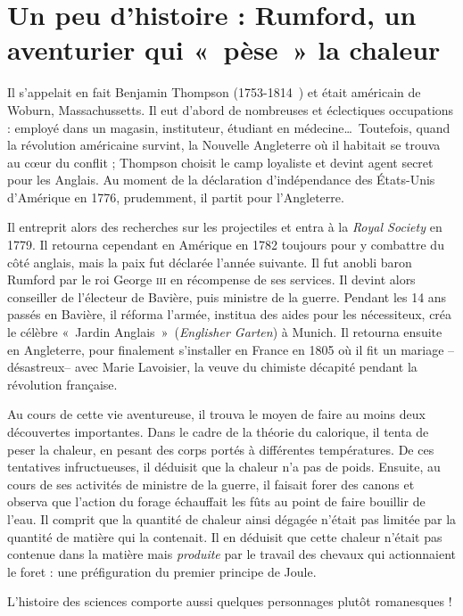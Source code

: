 \atstartofhistorysection
\section[Un peu d’histoire : l’aventurier Rumford]{Un peu d’histoire :\onlyamphibook{\\} Rumford, un aventurier qui «~pèse~» la chaleur}
\label{ch_histoire_rumford_depondt}


	Il s'appelait en fait Benjamin Thompson (1753-1814~\cite{millar1996}) et était américain de Woburn, Massachussetts. Il eut d'abord de nombreuses et éclectiques occupations : employé dans un magasin, instituteur, étudiant en médecine…\ Toutefois, quand la révolution américaine survint, la Nouvelle Angleterre où il habitait se trouva au cœur du conflit ; Thompson choisit le camp loyaliste et devint agent secret pour les Anglais. Au moment de la déclaration d'indépendance des États-Unis d'Amérique en 1776, prudemment, il partit pour l'Angleterre.

	Il entreprit alors des recherches sur les projectiles et entra à la \textit{Royal Society} en 1779. Il retourna cependant en Amérique en 1782 toujours pour y combattre du côté anglais, mais la paix fut déclarée l'année suivante. Il fut anobli baron Rumford par le roi George \textsc{iii} en récompense de ses services. Il devint alors conseiller de l'électeur de Bavière, puis ministre de la guerre. Pendant les 14 ans passés en Bavière, il réforma l'armée, institua des aides pour les nécessiteux, créa le célèbre «~Jardin Anglais~»\ (\textit{Englisher Garten}) à Munich. Il retourna ensuite en Angleterre, pour finalement s'installer en France en 1805 où il fit un mariage --désastreux-- avec Marie Lavoisier, la veuve du chimiste décapité pendant la révolution française.

	Au cours de cette vie aventureuse, il trouva le moyen de faire au moins deux découvertes importantes. Dans le cadre de la théorie du calorique, il tenta de peser la chaleur, en pesant des corps portés à différentes températures. De ces tentatives infructueuses, il déduisit que la chaleur n'a pas de poids. Ensuite, au cours de ses activités de ministre de la guerre, il faisait forer des canons et observa que l'action du forage échauffait les fûts au point de faire bouillir de l'eau. Il comprit que la quantité de chaleur ainsi dégagée n'était pas limitée par la quantité de matière qui la contenait. Il en déduisit que cette chaleur n'était pas contenue dans la matière mais \emph{produite} par le travail des chevaux qui actionnaient le foret : une préfiguration du premier principe de Joule.

	L'histoire des sciences comporte aussi quelques personnages plutôt romanesques !

\atendofhistorysection
